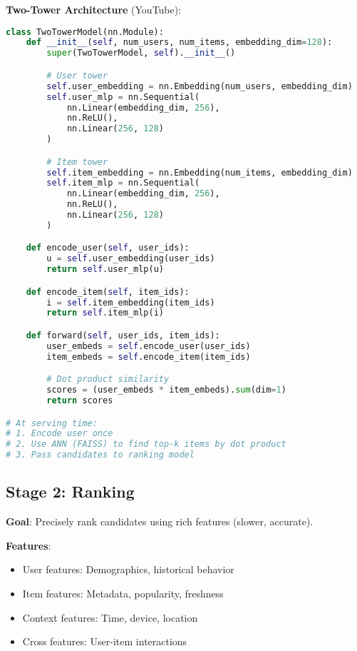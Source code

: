 \documentclass[10pt]{article}
\begin{document}
\textbf{Two-Tower Architecture} (YouTube):
\begin{lstlisting}[language=Python]
class TwoTowerModel(nn.Module):
    def __init__(self, num_users, num_items, embedding_dim=128):
        super(TwoTowerModel, self).__init__()

        # User tower
        self.user_embedding = nn.Embedding(num_users, embedding_dim)
        self.user_mlp = nn.Sequential(
            nn.Linear(embedding_dim, 256),
            nn.ReLU(),
            nn.Linear(256, 128)
        )

        # Item tower
        self.item_embedding = nn.Embedding(num_items, embedding_dim)
        self.item_mlp = nn.Sequential(
            nn.Linear(embedding_dim, 256),
            nn.ReLU(),
            nn.Linear(256, 128)
        )

    def encode_user(self, user_ids):
        u = self.user_embedding(user_ids)
        return self.user_mlp(u)

    def encode_item(self, item_ids):
        i = self.item_embedding(item_ids)
        return self.item_mlp(i)

    def forward(self, user_ids, item_ids):
        user_embeds = self.encode_user(user_ids)
        item_embeds = self.encode_item(item_ids)

        # Dot product similarity
        scores = (user_embeds * item_embeds).sum(dim=1)
        return scores

# At serving time:
# 1. Encode user once
# 2. Use ANN (FAISS) to find top-k items by dot product
# 3. Pass candidates to ranking model
\end{lstlisting}

\subsection{Stage 2: Ranking}

\textbf{Goal}: Precisely rank candidates using rich features (slower, accurate).

\textbf{Features}:
\begin{itemize}[leftmargin=*]
    \item User features: Demographics, historical behavior
    \item Item features: Metadata, popularity, freshness
    \item Context features: Time, device, location
    \item Cross features: User-item interactions
\end{itemize}
\end{document}
